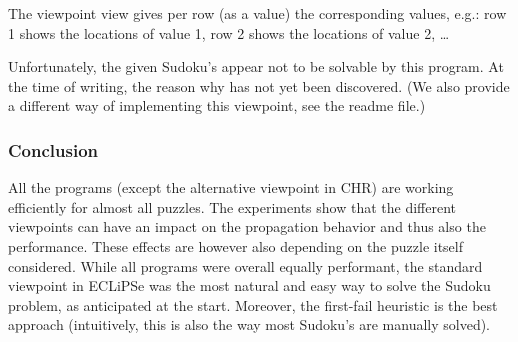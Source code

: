 The viewpoint view gives per row (as a value) the corresponding values, e.g.: row 1 shows the locations of value 1, row 2 shows the locations of value 2, \ldots

Unfortunately, the given Sudoku's appear not to be solvable by this program. At the time of writing, the reason why has not yet been discovered. (We also provide a different way of implementing this viewpoint, see the readme file.)


\subsubsection{Conclusion}
All the programs (except the alternative viewpoint in CHR) are working efficiently for almost all puzzles. The experiments show that the different viewpoints can have an impact on the propagation behavior and thus also the performance. These effects are however also depending on the puzzle itself considered. While all programs were overall equally performant, the standard viewpoint in ECLiPSe was the most natural and easy way to solve the Sudoku problem, as anticipated at the start. Moreover, the first-fail heuristic is the best approach (intuitively, this is also the way most Sudoku's are manually solved).